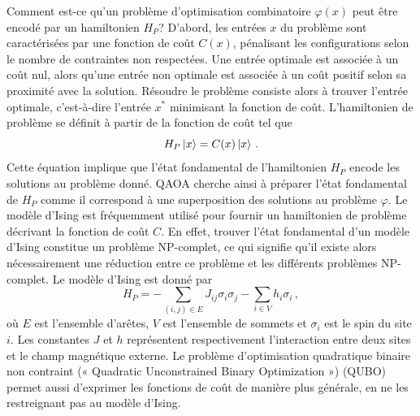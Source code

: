 Comment est-ce qu'un problème d'optimisation combinatoire $\varphi(x)$ peut être encodé par un hamiltonien $H_{P}$? D'abord, les entrées $x$ du problème sont caractérisées par une fonction de coût $C(x)$, pénalisant les configurations selon le nombre de contraintes non respectées. Une entrée optimale est associée à un coût nul, alors qu'une entrée non optimale est associée à un coût positif selon sa proximité avec la solution. Résoudre le problème consiste alors à trouver l'entrée optimale, c'est-à-dire l'entrée $x^{*}$ minimisant la fonction de coût. L'hamiltonien de problème se définit à partir de la fonction de coût tel que
\begin{equation}
    H_{P} \ket{x} = C(x) \ket{x} \,.
\end{equation}
Cette équation implique que l'état fondamental de l'hamiltonien $H_{P}$ encode les solutions au problème donné. QAOA cherche ainsi à préparer l'état fondamental de $H_{P}$ comme il correspond à une superposition des solutions au problème $\varphi$. Le modèle d'Ising est fréquemment utilisé pour fournir un hamiltonien de problème décrivant la fonction de coût $C$. En effet, trouver l'état fondamental d'un modèle d'Ising constitue un problème \textsf{NP}-complet, ce qui signifie qu'il existe alors nécessairement une réduction entre ce problème et les différents problèmes \textsf{NP}-complet. Le modèle d'Ising est donné par
\begin{equation}
    \label{eq:hamiltonien-ising}
    H_P = - \sum_{(i,j) \in E} J_{ij} \sigma_i \sigma_j - \sum_{i \in V} h_i \sigma_i \,,
\end{equation}
où $E$ est l'ensemble d'arêtes, $V$ est l'ensemble de sommets et $\sigma_{i}$ est le spin du site $i$. Les constantes $J$ et $h$ représentent respectivement l'interaction entre deux sites et le champ magnétique externe. Le problème d'optimisation quadratique binaire non contraint (« Quadratic Unconstrained Binary Optimization ») (QUBO) permet aussi d'exprimer les fonctions de coût de manière plus générale, en ne les restreignant pas au modèle d'Ising.

